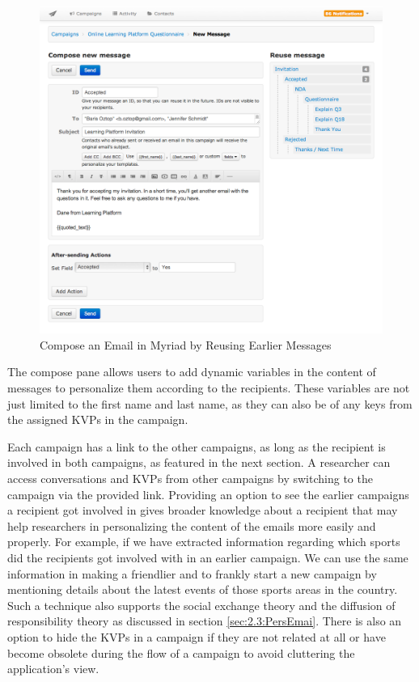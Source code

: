 \begin{figure}[htbp]
	\centering
	\includegraphics[width=1.00\textwidth]{imgs/ComposeEmail.png}
	\caption[Compose an Email in Myriad by Reusing Earlier Messages]{Compose an Email in Myriad by Reusing Earlier Messages}
	\label{fig:ComposeEmail}
\end{figure}

The compose pane allows users to add dynamic variables in the content of messages to personalize them according to the recipients. These variables are not just limited to the first name and last name, as they can also be of any keys from the assigned \ac{KVP}s in the campaign.
\vspace{1cm}

Each campaign has a link to the other campaigns, as long as the recipient is involved in both campaigns, as featured in the next section. A researcher can access conversations and \ac{KVP}s from other campaigns by switching to the campaign via the provided link. Providing an option to see the earlier campaigns a recipient got involved in gives broader knowledge about a recipient that may help researchers in personalizing the content of the emails more easily and properly. For example, if we have extracted information regarding which sports did the recipients got involved with in an earlier campaign. We can use the same information in making a friendlier and to frankly start a new campaign by mentioning details about the latest events of those sports areas in the country. Such a technique also supports the social exchange theory and the diffusion of responsibility theory as discussed in section \ref{sec:2.3:PersEmai}. There is also an option to hide the \ac{KVP}s in a campaign if they are not related at all or have become obsolete during the flow of a campaign to avoid cluttering the application's view.
\vspace{1cm}

